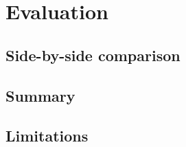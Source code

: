 
\section{Evaluation}

\subsection{Side-by-side comparison}

\subsection{Summary}

\subsection{Limitations}

